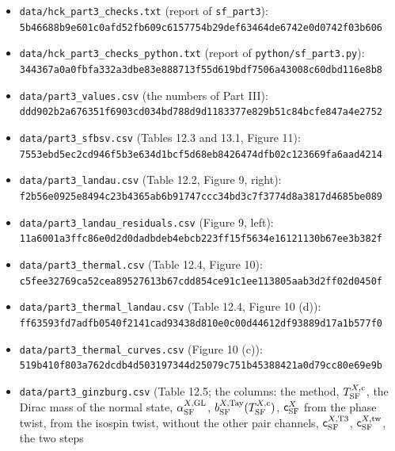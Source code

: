 \documentclass[
  10pt,
]{article}
\providecommand{\tightlist}{%
  \setlength{\itemsep}{0pt}\setlength{\parskip}{0pt}}
\begin{document}
\begin{itemize}
\tightlist
\item
  \texttt{data/hck\_part3\_checks.txt} (report of \texttt{sf\_part3}):\\
  \texttt{5b46688b9e601c0afd52fb609c6157754b29def63464de6742e0d0742f03b606}
\item
  \texttt{data/hck\_part3\_checks\_python.txt} (report of
  \texttt{python/sf\_part3.py}):\\
  \texttt{344367a0a0fbfa332a3dbe83e888713f55d619bdf7506a43008c60dbd116e8b8}
\item
  \texttt{data/part3\_values.csv} (the numbers of Part III):\\
  \texttt{ddd902b2a676351f6903cd034bd788d9d1183377e829b51c84bcfe847a4e2752}
\item
  \texttt{data/part3\_sfbsv.csv} (Tables 12.3 and 13.1, Figure 11):\\
  \texttt{7553ebd5ec2cd946f5b3e634d1bcf5d68eb8426474dfb02c123669fa6aad4214}
\item
  \texttt{data/part3\_landau.csv} (Table 12.2, Figure 9, right):\\
  \texttt{f2b56e0925e8494c23b4365ab6b91747ccc34bd3c7f3774d8a3817d4685be089}
\item
  \texttt{data/part3\_landau\_residuals.csv} (Figure 9, left):\\
  \texttt{11a6001a3ffc86e0d2d0dadbdeb4ebcb223ff15f5634e16121130b67ee3b382f}
\item
  \texttt{data/part3\_thermal.csv} (Table 12.4, Figure 10):\\
  \texttt{c5fee32769ca52cea89527613b67cdd854ce91c1ee113805aab3d2ff02d0450f}
\item
  \texttt{data/part3\_thermal\_landau.csv} (Table 12.4, Figure 10
  (d)):\\
  \texttt{ff63593fd7adfb0540f2141cad93438d810e0c00d44612df93889d17a1b577f0}
\item
  \texttt{data/part3\_thermal\_curves.csv} (Figure 10 (c)):\\
  \texttt{519b410f803a762dcdb4d503197344d25079c751b45388421a0d79cc80e69e9b}
\item
  \texttt{data/part3\_ginzburg.csv} (Table 12.5; the columns: the
  method, \(T^{X,{\rm c}}_{\rm SF}\), the Dirac mass of the normal
  state, \(\alpha^{X,{\rm GL}}_{\rm SF}\),
  \(b^{X,{\rm Tay}}_{\rm SF}(T^{X,{\rm c}}_{\rm SF})\),
  \(\mathsf c^X_{\rm SF}\) from the phase twist, from the isospin twist,
  without the other pair channels, \(\mathsf c^{X,{\rm T3}}_{\rm SF}\),
  \(\mathsf c^{X,{\rm tw}}_{\rm SF}\), the two steps

\end{itemize}
\end{document}
